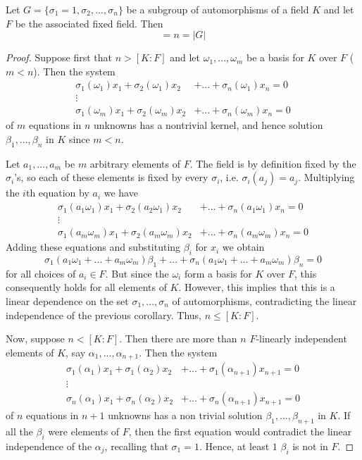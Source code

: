 \begin{theorem}\label{thm:subfixed}
    Let $G=\{\sigma_1 = 1,\sigma_2,...,\sigma_n\}$ be a subgroup of automorphisms of a field $K$ and let $F$ be the associated fixed field. Then \begin{equation*}
        [K:F] = n = |G|
    \end{equation*}
\end{theorem}
\begin{proof}
    Suppose first that $n > [K:F]$ and let $\omega_1,...,\omega_m$ be a basis for $K$ over $F$ ($m < n$). Then the system \begin{align*}
        \sigma_1(\omega_1)x_1 + \sigma_2(\omega_1)x_2&+...+\sigma_n(\omega_1)x_n = 0 \\
        \vdots& \\
        \sigma_1(\omega_m)x_1 + \sigma_2(\omega_m)x_2&+...+\sigma_n(\omega_m)x_n = 0 
    \end{align*}
    of $m$ equations in $n$ unknowns has a nontrivial kernel, and hence solution $\beta_1,...,\beta_n$ in $K$ since $m < n$. 

    Let $a_1,...,a_m$ be $m$ arbitrary elements of $F$. The field is by definition fixed by the $\sigma_i$'s, so each of these elements is fixed by every $\sigma_i$, i.e. $\sigma_i(a_j) = a_j$. Multiplying the $i$th equation by $a_i$ we have
    \begin{align*}
        \sigma_1(a_1\omega_1)x_1 + \sigma_2(a_2\omega_1)x_2&+...+\sigma_n(a_1\omega_1)x_n = 0 \\
        \vdots& \\
        \sigma_1(a_m\omega_m)x_1 + \sigma_2(a_m\omega_m)x_2&+...+\sigma_n(a_m\omega_m)x_n = 0 
    \end{align*}
    Adding these equations and substituting $\beta_i$ for $x_i$ we obtain \begin{equation*}
        \sigma_1(a_1\omega_1+...+a_m\omega_m)\beta_1+...+\sigma_n(a_1\omega_1+...+a_m\omega_m)\beta_n = 0
    \end{equation*}
    for all choices of $a_i \in F$. But since the $\omega_i$ form a basis for $K$ over $F$, this consequently holds for all elements of $K$. However, this implies that this is a linear dependence on the set $\sigma_1,...,\sigma_n$ of automorphisms, contradicting the linear independence of the previous corollary. Thus, $n \leq [K:F]$. 

    Now, suppose $n < [K:F]$. Then there are more than $n$ $F$-linearly independent elements of $K$, say $\alpha_1,...,\alpha_{n+1}$. Then the system 
    \begin{align*}
        \sigma_1(\alpha_1)x_1 + \sigma_1(\alpha_2)x_2&+...+\sigma_1(\alpha_{n+1})x_{n+1} = 0 \\
        \vdots& \\
        \sigma_n(\alpha_1)x_1 + \sigma_n(\alpha_2)x_2&+...+\sigma_n(\alpha_{n+1})x_{n+1} = 0 
    \end{align*}
    of $n$ equations in $n+1$ unknowns has a non trivial solution $\beta_1,...,\beta_{n+1}$ in $K$. If all the $\beta_i$ were elements of $F$, then the first equation would contradict the linear independence of the $\alpha_j$, recalling that $\sigma_1 = 1$. Hence, at least $1$ $\beta_i$ is not in $F$.


\end{proof}
